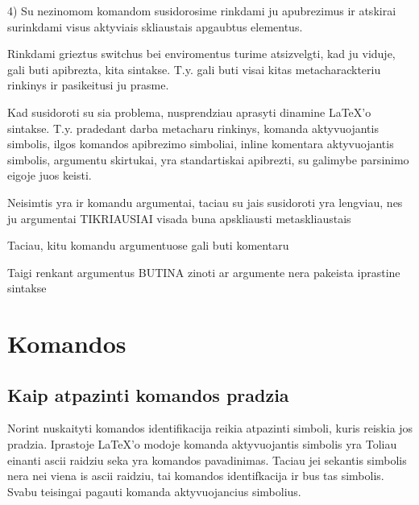 \documentclass{article}
\begin{document}
4) Su nezinomom komandom susidorosime rinkdami ju apubrezimus ir atskirai
surinkdami visus aktyviais skliaustais %
apgaubtus elementus.

Rinkdami grieztus switchus bei enviromentus turime atsizvelgti,
kad ju viduje, gali buti apibrezta, kita sintakse. 
T.y. gali buti visai kitas metacharackteriu rinkinys ir pasikeitusi ju prasme.


Kad susidoroti su sia problema, nusprendziau aprasyti dinamine LaTeX'o
sintakse. T.y. pradedant darba metacharu 
rinkinys, %
komanda aktyvuojantis simbolis, %
ilgos komandos apibrezimo simboliai, %
inline komentara aktyvuojantis simbolis, %
argumentu skirtukai, %
yra standartiskai apibrezti, su galimybe parsinimo eigoje juos keisti.

Neisimtis yra ir komandu argumentai, 
taciau su jais susidoroti yra lengviau, nes ju argumentai
TIKRIAUSIAI visada buna apskliausti metaskliaustais %

Taciau, kitu komandu argumentuose gali buti komentaru

Taigi renkant argumentus BUTINA zinoti ar argumente nera pakeista 
iprastine sintakse






\section{Komandos}




\subsection{Kaip atpazinti komandos pradzia}

Norint nuskaityti komandos identifikacija reikia atpazinti simboli,
kuris reiskia jos pradzia. 
Iprastoje \LaTeX 'o modoje komanda aktyvuojantis simbolis 
yra %
Toliau einanti ascii raidziu seka yra komandos
pavadinimas. Taciau jei sekantis simbolis nera nei viena is ascii 
raidziu, tai komandos identifkacija ir bus tas simbolis.
Svabu teisingai pagauti komanda aktyvuojancius simbolius.
\end{document}
